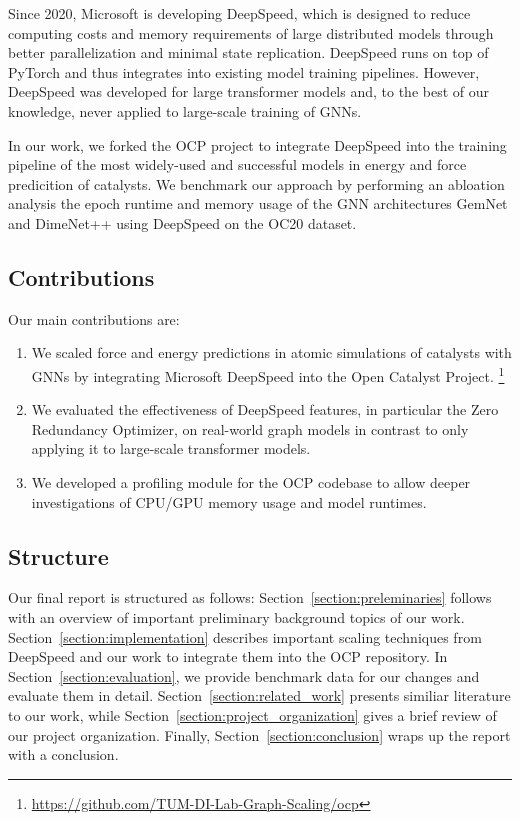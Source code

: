 Since 2020, Microsoft is developing DeepSpeed, which is designed to reduce computing costs and memory 
requirements of large distributed models through better parallelization and minimal state replication. DeepSpeed 
runs on top of PyTorch and thus integrates into existing model training pipelines. However, DeepSpeed was developed 
for large transformer models and, to the best of our knowledge, never applied to large-scale training of GNNs.

In our work, we forked the OCP project to integrate DeepSpeed into the training pipeline of the most widely-used 
and successful models in energy and force predicition of catalysts. 
We benchmark our approach by performing an abloation analysis the epoch runtime and memory usage of the GNN architectures GemNet and 
DimeNet++ using DeepSpeed on the OC20 dataset.


\subsection{Contributions}

Our main contributions are:

\begin{enumerate}
    \item We scaled force and energy predictions in atomic simulations of catalysts with GNNs 
    by integrating Microsoft DeepSpeed into the Open Catalyst Project.
    \footnote{\url{https://github.com/TUM-DI-Lab-Graph-Scaling/ocp}}
    \item We evaluated the effectiveness of DeepSpeed features, in particular the Zero Redundancy Optimizer, on 
    real-world graph models in contrast to only applying it to large-scale transformer models.
    \item We developed a profiling module for the OCP codebase to allow deeper investigations of CPU/GPU memory 
    usage and model runtimes.
\end{enumerate}

\subsection{Structure}

Our final report is structured as follows: Section~\ref{section:preleminaries} follows with an overview of 
important preliminary background topics of our work. Section~\ref{section:implementation} describes important 
scaling techniques from DeepSpeed and our work to integrate them into the OCP repository. In 
Section~\ref{section:evaluation}, we provide benchmark data for our changes and evaluate them in detail. 
Section~\ref{section:related_work} presents similiar literature to our work, while Section~\ref{section:project_organization} 
gives a brief review of our project organization. Finally, Section~\ref{section:conclusion} wraps up the 
report with a conclusion.